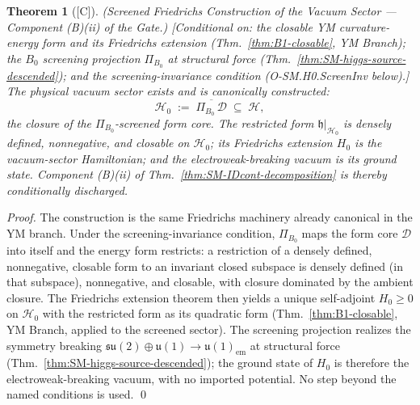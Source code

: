 \documentclass[12pt,oneside]{amsbook}
\theoremstyle{plain}
\newtheorem{theorem}{Theorem}[section]
\theoremstyle{definition}
\theoremstyle{remark}
\newcommand{\status}[1]{\textup{[#1]}}
\begin{document}
\begin{theorem}[\status{C}]\label{thm:SM-H0-Friedrichs}
\textup{(Screened Friedrichs Construction of the Vacuum Sector ---
Component (B)(ii) of the Gate.)}
\textup{[Conditional on: the closable YM curvature-energy form and
its Friedrichs extension (Thm.~\ref{thm:B1-closable}, YM Branch);
the $B_0$ screening projection $\Pi_{B_0}$ at structural force
(Thm.~\ref{thm:SM-higgs-source-descended}); and the
\emph{screening-invariance condition} (O-SM.H0.ScreenInv below).]}
The physical vacuum sector exists and is canonically constructed:
\[
  \mathcal{H}_0 \;:=\; \overline{\Pi_{B_0}\,\mathcal{D}}
  \;\subseteq\; \mathcal{H},
\]
the closure of the $\Pi_{B_0}$-screened form core.  The restricted
form $\mathfrak{h}|_{\mathcal{H}_0}$ is densely defined,
nonnegative, and closable on $\mathcal{H}_0$; its Friedrichs
extension $H_0$ is the vacuum-sector Hamiltonian; and the
electroweak-breaking vacuum is its ground state.  Component
(B)(ii) of Thm.~\ref{thm:SM-IDcont-decomposition} is thereby
conditionally discharged.
\end{theorem}

\begin{proof}
The construction is the same Friedrichs machinery already
canonical in the YM branch.  Under the screening-invariance
condition, $\Pi_{B_0}$ maps the form core $\mathcal{D}$ into
itself and the energy form restricts: a restriction of a densely
defined, nonnegative, closable form to an invariant closed
subspace is densely defined (in that subspace), nonnegative, and
closable, with closure dominated by the ambient closure.  The
Friedrichs extension theorem then yields a unique self-adjoint
$H_0 \ge 0$ on $\mathcal{H}_0$ with the restricted form as its
quadratic form (Thm.~\ref{thm:B1-closable}, YM Branch, applied to
the screened sector).  The screening projection realizes the
symmetry breaking $\mathfrak{su}(2)\oplus\mathfrak{u}(1) \to
\mathfrak{u}(1)_{\mathrm{em}}$ at structural force
(Thm.~\ref{thm:SM-higgs-source-descended}); the ground state of
$H_0$ is therefore the electroweak-breaking vacuum, with no
imported potential.  No step beyond the named conditions is used.
\qed
\end{proof}
\end{document}
